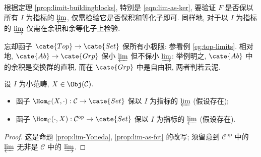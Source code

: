 \begin{remark}\label{rem:preservation-limit}
	根据定理 \ref{prop:limit-buildingblocks}, 特别是 \eqref{eqn:lim-as-ker}, 要验证 $F$ 是否保以所有 $I$ 为指标的 $\varprojlim$, 仅需检验它是否保积和等化子即可. 同样地, 对于以 $I$ 为指标的 $\varinjlim$ 仅需在余积和余等化子上检验.
\end{remark}

\begin{example}\label{eg:preservation-limit}
	忘却函子 $\cate{Top} \to \cate{Set}$ 保所有小极限: 参看例 \ref{eg:top-limits}. 相对地, $\cate{Ab} \to \cate{Grp}$ 保小 $\varprojlim$ 但不保小 $\varinjlim$: 举例明之, $\cate{Ab}$ 中的余积是交换群的直积, 而在 $\cate{Grp}$ 中是自由积, 两者判若云泥.
\end{example}

\begin{proposition}\label{prop:Hom-exact}
	设 $I$ 为小范畴, $X \in \Obj(\mathcal{C})$.
	\begin{itemize}
		\item 函子 $\Hom_{\mathcal{C}}(X, \cdot): \mathcal{C} \to \cate{Set}$ 保以 $I$ 为指标的 $\varprojlim$ (假设存在);
		\item 函子 $\Hom_{\mathcal{C}}(\cdot, X): \mathcal{C}^\text{op} \to \cate{Set}$	保以 $I$ 为指标的 $\varprojlim$ (假设存在).
	\end{itemize}
\end{proposition}
\begin{proof}
	这是命题 \ref{prop:lim-Yoneda}, \ref{prop:lim-as-fct} 的改写; 须留意到 $\mathcal{C}^\text{op}$ 中的 $\varprojlim$ 无非是 $\mathcal{C}$ 中的 $\varinjlim$.
\end{proof}

